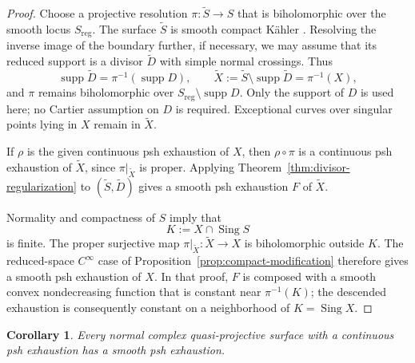 \documentclass[11pt]{amsart}
\newtheorem{corollary}[theorem]{Corollary}
\theoremstyle{definition}
\theoremstyle{remark}
\numberwithin{equation}{section}
\newcommand{\supp}{\operatorname{supp}}
\begin{document}
\begin{proof}
Choose a projective resolution $\pi:\widetilde S\to S$ that is
biholomorphic over the smooth locus $S_{\mathrm{reg}}$. The surface
$\widetilde S$ is smooth compact K\"ahler
\cite[\S2, Theorem~2.4 and the preceding discussion]{GrafSchwald2021}.
Resolving the inverse image of the boundary further, if necessary,
we may assume that its reduced support is a divisor $\widetilde D$
with simple normal crossings. Thus
\[
 \supp\widetilde D=\pi^{-1}(\supp D),\qquad
 \widetilde X:=\widetilde S\setminus\supp\widetilde D=\pi^{-1}(X),
\]
and $\pi$ remains biholomorphic over
$S_{\mathrm{reg}}\setminus\supp D$.
Only the support of $D$ is used here; no Cartier assumption on $D$
is required. Exceptional curves over singular points lying in $X$
remain in $\widetilde X$.

If $\rho$ is the given continuous psh exhaustion of $X$, then
$\rho\circ\pi$ is a continuous psh exhaustion of $\widetilde X$,
since $\pi|_{\widetilde X}$ is proper. Applying
Theorem~\ref{thm:divisor-regularization} to
$(\widetilde S,\widetilde D)$ gives a smooth psh exhaustion $F$
of $\widetilde X$.

Normality and compactness of $S$ imply that
\[
 K:=X\cap\operatorname{Sing}S
\]
is finite. The proper surjective map
$\pi|_{\widetilde X}:\widetilde X\to X$ is biholomorphic outside
$K$. The reduced-space $C^\infty$ case of
Proposition~\ref{prop:compact-modification} therefore gives a smooth
psh exhaustion of $X$. In that proof, $F$ is composed with a smooth
convex nondecreasing function that is constant near $\pi^{-1}(K)$;
the descended exhaustion is consequently constant on a neighborhood
of $K=\operatorname{Sing}X$.
\end{proof}

\begin{corollary}\label{cor:quasiprojective-regularization}
Every normal complex quasi-projective surface with a continuous
psh exhaustion has a smooth psh exhaustion.
\end{corollary}
\end{document}
